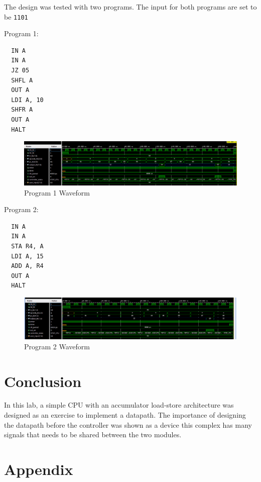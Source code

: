 \documentclass[12pt]{article}
\begin{document}
The design was tested with two programs. The input for both programs are set to be \verb|1101|

Program 1:
\begin{verbatim}
  IN A
  IN A
  JZ 05
  SHFL A
  OUT A 
  LDI A, 10
  SHFR A
  OUT A
  HALT
\end{verbatim}

\begin{figure}[H]
  \centering
  \includegraphics[width=\linewidth]{Program1_waveform.png}
  \caption{Program 1 Waveform}
\end{figure}

Program 2:
\begin{verbatim}
  IN A
  IN A
  STA R4, A
  LDI A, 15
  ADD A, R4
  OUT A
  HALT
\end{verbatim}

\begin{figure}[H]
  \centering
  \includegraphics[width=\linewidth]{Program2_waveform.png}
  \caption{Program 2 Waveform}
\end{figure}

\section{Conclusion}

In this lab, a simple CPU with an accumulator load-store architecture was designed as an exercise to implement a datapath. The importance of designing the datapath before the controller was shown as a device this complex has many signals that needs to be shared between the two modules.

\pagebreak
\section{Appendix}
\end{document}
